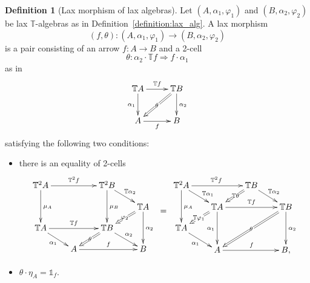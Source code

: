 \documentclass[12pt,leqno]{amsart}
\theoremstyle{definition}
\newtheorem{definition}[theorem]{Definition}
\def\T{\mathbb{T}}
\def\id{{\mathbb 1}}
\newcommand{\4}{\texttt{4}}
\renewcommand{\phi}{\varphi}
\begin{document}
\begin{definition}[Lax morphism of lax algebras]
\label{definition:lax_alg_lax_morph}
Let $(A,\alpha_1,\phi_1)$ and $(B,\alpha_2,\phi_2)$ be lax
$\T$-algebras as in Definition~\ref{definition:lax_alg}. 
A lax morphism
\[
(f,\theta)\colon (A,\alpha_1,\phi_1)\to (B,\alpha_2,\phi_2)
\]
is a pair consisting of an arrow
$f\colon A\to B$ and a 2-cell
\[
\theta\colon \alpha_2\cdot \T f  \Rightarrow f\cdot \alpha_1
\]
as in
\[
\xymatrix@R=2.5em@C=2.5em{
\T A \ar[r]^{\T f} \ar[d]_{\alpha_1} 
& \T B\ar[d]^{\alpha_2} \ar@{=>}[dl]|{\theta\rule{.1em}{0pt}}
\\
A \ar[r]_{f} & B
}
\]
satisfying the following two conditions:
\begin{itemize}[topsep=0pt, partopsep=0pt, itemsep=0pt, itemindent=-1em]
\item[(i)] 
there is an equality of 2-cells
\[
\xymatrix@R=1.2em@C=2em{
\T^2 A \ar[rr]^{\T^2 f}\ar[dd]^{\mu_A}
&&\T^2  B \ar[dd]^{\mu_B} \ar[rd]^{\T\alpha_2}
\\
&&& \T  A  \ar[dd]^{\alpha_2}
\ar@{=>}[ld]|{\phi_2\rule{.1em}{0pt}}
\\
\T  A \ar[rr]^{\T f} \ar[rd]_{\alpha_1} && \T B
\ar@{=>}[ld]|{\theta\rule{.1em}{0pt}}
\ar[dr]^{\alpha_2}
\\
&A \ar[rr]^{f} && B
}
\hskip .5em
\raisebox{-3em}{$=$} \hskip .5em
\xymatrix@R=1.2em@C=2em{
\T^2  A \ar[rr]^{\T^2 f}\ar[dd]^{\mu_A} 
\ar[rd]^(.6){\T \alpha_1}   && 
\T B  \ar[rd]^{\T \alpha_2} \ar@{=>}[ld]|(.45){\T{\theta\rule{.1em}{0pt}}}
\\
&\T A  \ar[rr]^{\T f}   \ar[dd]_{\alpha_1}
\ar@{=>}[ld]|{\T\phi_1\rule{.1em}{0pt}}
&& \T B 
\ar[dd]^{\alpha_2} 
\ar@{=>}[lldd]|{\theta\rule{.1em}{0pt}}
\\
\T A \ar[rd]_{\alpha_1} &&
\\
& A \ar[rr]^{f} && B,
}
\]
\item[(ii)] 
$\theta\cdot\eta_A=\id_f$.
\end{itemize}
\end{definition}
\end{document}
